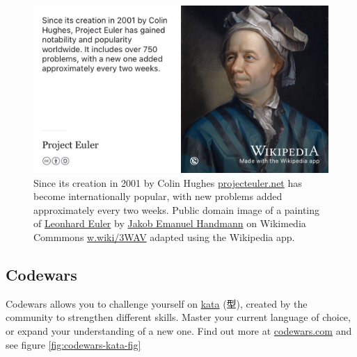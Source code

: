 \documentclass[
]{book}
\begin{document}
\begin{figure}

{\centering \includegraphics[width=0.99\linewidth]{images/project-euler} 

}

\caption{Since its creation in 2001 by Colin Hughes \href{https://projecteuler.net/}{projecteuler.net} has become internationally popular, with new problems added approximately every two weeks. \citep{colinhughes} Public domain image of a painting of \href{https://en.wikipedia.org/wiki/Leonhard_Euler}{Leonhard Euler} by \href{https://en.wikipedia.org/wiki/Jakob_Emanuel_Handmann}{Jakob Emanuel Handmann} on Wikimedia Commmons \href{https://w.wiki/3WAV}{w.wiki/3WAV} adapted using the Wikipedia app.}\label{fig:euler-fig}
\end{figure}



\hypertarget{codewars}{%
\subsection{Codewars}\label{codewars}}

Codewars allows you to challenge yourself on \href{https://en.wikipedia.org/wiki/Kata}{kata} (型), created by the community to strengthen different skills. Master your current language of choice, or expand your understanding of a new one. Find out more at \href{https://www.codewars.com}{codewars.com} and see figure \ref{fig:codewars-kata-fig}
\end{document}
